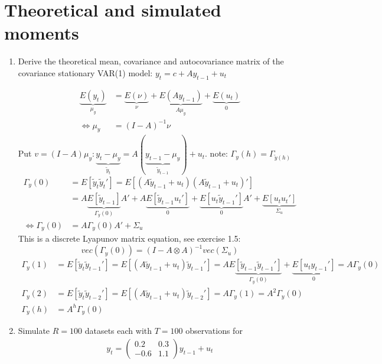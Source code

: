 \documentclass[a4paper]{scrartcl}
\begin{document}
\section{Theoretical and simulated moments}
\begin{enumerate}
	\item Derive the theoretical mean, covariance and autocovariance matrix of the covariance stationary VAR(1) model: $y_t = c + A y_{t-1} + u_t$
	\begin{solution}
	\begin{align*}
		\underbrace{E(y_t)}_{\mu_y} &= \underbrace{E(\nu)}_{\nu} + \underbrace{E(A y_{t-1})}_{A \mu_y} + \underbrace{E(u_t)}_{0}\\
		\Leftrightarrow \mu_y &= (I-A)^{-1} \nu
		\end{align*}
		Put $v = (I-A)\mu_y: \underbrace{y_t -\mu_y}_{\tilde{y}_{t}} = A(\underbrace{y_{t-1}-\mu_y}_{\tilde{y}_{t-1}}) + u_t$. note: $\Gamma_y(h) = \Gamma_{\tilde{y}(h)}$
		\begin{align*}
		\Gamma_y(0) &= E\left[\tilde{y}_t \tilde{y}_t'\right]= E\left[(A \tilde{y}_{t-1} + u_t)(A \tilde{y}_{t-1} + u_t)'\right]\\
		&= A \underbrace{E\left[\tilde{y}_{t-1}\right]}_{\Gamma_y(0)} A' + A \underbrace{E\left[\tilde{y}_{t-1}u_t'\right]}_{0} + \underbrace{E\left[u_t \tilde{y}_{t-1}'\right]}_{0} A' + \underbrace{E\left[u_t u_t'\right]}_{\Sigma_u}\\
		\Leftrightarrow \Gamma_y(0) &= A \Gamma_y(0) A' + \Sigma_u
		\end{align*}
		This is a discrete Lyapunov matrix equation, see exercise 1.5: $$vec(\Gamma_y(0)) = (I-A \otimes A)^{-1} vec(\Sigma_u)$$
		\begin{align*}
		\Gamma_y(1) &=  E\left[\tilde{y}_t \tilde{y}_{t-1}'\right]= E\left[(A \tilde{y}_{t-1} + u_t)\tilde{y}_{t-1}'\right] = A E\underbrace{\left[\tilde{y}_{t-1}\tilde{y}_{t-1}'\right]}_{\Gamma_y(0)} + \underbrace{E\left[u_t y_{t-1}'\right]}_{0} = A \Gamma_y(0)\\
		\Gamma_y(2) &=  E\left[\tilde{y}_t \tilde{y}_{t-2}'\right]= E\left[(A \tilde{y}_{t-1} + u_t)\tilde{y}_{t-2}'\right] = A \Gamma_y(1) = A^2 \Gamma_y(0)\\
		\Gamma_y(h) &= A^h \Gamma_y(0)
		\end{align*}
	\end{solution}
	\item Simulate $R=100$ datasets each with $T=100$ observations for
	\begin{align*}
	y_t = \begin{pmatrix}0.2 &0.3 \\-0.6 & 1.1 \end{pmatrix} y_{t-1}  + u_t

\end{align*}
\end{enumerate}
\end{document}
